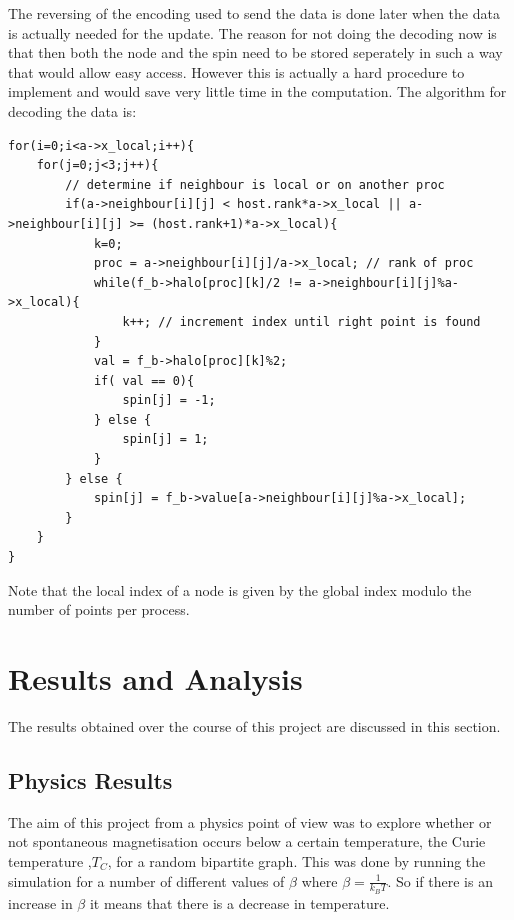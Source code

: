 \documentclass[pdftex,12pt,a4paper]{article}
\begin{document}
The reversing of the encoding used to send the data is done later when the  data is actually needed for the update. The reason for not doing the decoding now is that then both the node and the spin need to be stored seperately in such a way that would allow easy access. However this is actually a hard procedure to implement and would save very little time in the computation. The algorithm for decoding the data is:
\newpage
\begin{lstlisting}
for(i=0;i<a->x_local;i++){
	for(j=0;j<3;j++){
		// determine if neighbour is local or on another proc
		if(a->neighbour[i][j] < host.rank*a->x_local || a->neighbour[i][j] >= (host.rank+1)*a->x_local){
			k=0; 	
			proc = a->neighbour[i][j]/a->x_local; // rank of proc
			while(f_b->halo[proc][k]/2 != a->neighbour[i][j]%a->x_local){
				k++; // increment index until right point is found
			}
			val = f_b->halo[proc][k]%2;
			if( val == 0){
				spin[j] = -1;
			} else {
				spin[j] = 1;
			}
		} else { 
			spin[j] = f_b->value[a->neighbour[i][j]%a->x_local];
		}
	}
}
\end{lstlisting}

Note that the local index of a node is given by the global index modulo the number of points per process. 







\newpage

\section{Results and Analysis}

The results obtained over the course of this project are discussed in this section.

\subsection{Physics Results}

The aim of this project from a physics point of view was to explore whether or not spontaneous magnetisation occurs below a certain temperature, the Curie temperature ,$T_C$, for a random bipartite graph. This was done by running the simulation for a number of different values of $\beta$ where $\beta = \frac{1}{k_B T}$. So if there is an increase in $\beta$ it means that there is a decrease in temperature.
\end{document}

